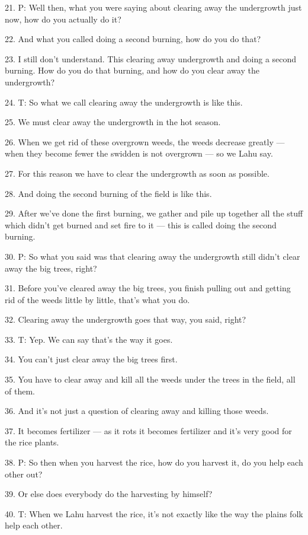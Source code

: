 21. P: Well then, what you were saying about clearing away the undergrowth just
now, how do you actually do it?

22. And what you called doing a second burning, how do you do that?

23. I still don't understand. This clearing away undergrowth and doing a second
burning. How do you do that burning, and how do you clear away the undergrowth?

24. T: So what we call clearing away the undergrowth is like this.

25. We must clear away the undergrowth in the hot season.

26. When we get rid of these overgrown weeds, the weeds decrease greatly --- when
they become fewer the swidden is not overgrown --- so we Lahu say.

27. For this reason we have to clear the undergrowth as soon as possible.

28. And doing the second burning of the field is like this.

29. After we've done the first burning, we gather and pile up together all the stuff
which didn't get burned and set fire to it --- this is called doing the second
burning.

30. P: So what you said was that clearing away the undergrowth still didn't clear
away the big trees, right?

31. Before you've cleared away the big trees, you finish pulling out and getting
rid of the weeds little by little, that's what you do.

32. Clearing away the undergrowth goes that way, you said, right?

33. T: Yep. We can say that's the way it goes.

34. You can't just clear away the big trees first.

35. You have to clear away and kill all the weeds under the trees in the field,
all of them.

36. And it's not just a question of clearing away and killing those weeds.

37. It becomes fertilizer --- as it rots it becomes fertilizer and it's very good
for the rice plants.

38. P: So then when you harvest the rice, how do you harvest it, do you help
each other out?

39. Or else does everybody do the harvesting by himself?

40. T: When we Lahu harvest the rice, it's not exactly like the way the plains
folk help each other.

